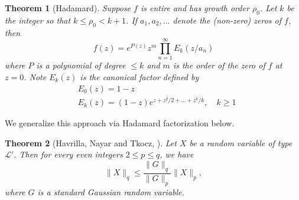 \documentclass[10pt]{article}
\newcommand{\1}{\textbf{1}}
\newtheorem{theorem}{Theorem}[subsection]
\theoremstyle{remark}
\theoremstyle{definition}
\begin{document}
\begin{theorem}[Hadamard]\label{thm:Had}
	Suppose $f$ is entire and has growth order $\rho_0$. Let $k$ be the integer so that $k \leq \rho_0 < k+1$. If $a_1,a_2,...$ denote the (non-zero) zeros of $f$, then
	\begin{equation*}
		f(z) = e^{P(z)} z^m \prod_{n=1}^{\infty}E_k(z/a_n)
	\end{equation*} where $P$ is a polynomial of degree $\leq k$ and $m$ is the order of the zero of $f$ at $z = 0$. Note $E_k(z)$ is the canonical factor defined by 
	\begin{align*}
		&E_0(z) = 1-z\\
		&E_k(z) = (1-z)e^{z+z^2/2+...+z^k/k}, \quad k \geq 1
	\end{align*}
\end{theorem} We generalize this approach via Hadamard factorization below.

\begin{theorem}[Havrilla, Nayar and Tkocz, \cite{HNT}]\label{thm:L2}
Let $X$ be a random variable of type $\mathcal{L}'$. Then for every even integers $2 \leq p \leq q$, we have
\begin{equation*}\label{eq:mom-comp}
\|X\|_q \leq \frac{\|G\|_q}{\|G\|_p}\|X\|_p,
\end{equation*}
where $G$ is a standard Gaussian random variable.
\end{theorem}
\end{document}
